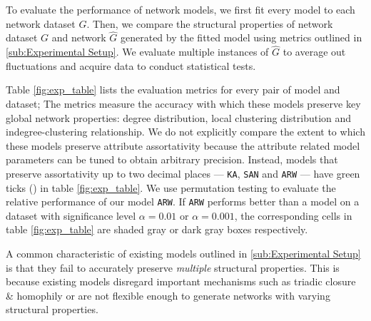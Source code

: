 To evaluate the performance of network models, we first fit every model
to each network dataset $G$. Then, we compare the structural properties of
network dataset $G$ and network $\hat{G}$ generated by the fitted model using
metrics outlined in \cref{sub:Experimental Setup}. We evaluate multiple instances
of $\hat{G}$ to average out fluctuations and acquire data to conduct statistical tests.

Table \ref{fig:exp_table} lists the evaluation metrics for every pair of model
and dataset; The metrics measure the accuracy with which these models
preserve key global network properties: degree distribution, local clustering distribution
and indegree-clustering relationship.
We do not explicitly compare the extent to which these models preserve
attribute assortativity because the attribute related model parameters can be tuned to obtain
arbitrary precision. Instead, models that preserve assortativity up to two decimal
places --- \texttt{KA}, \texttt{SAN} and \texttt{ARW}
--- have green ticks (\checkmark) in table \ref{fig:exp_table}.
We use permutation testing to evaluate the relative performance of our model \texttt{ARW}. If
\texttt{ARW} performs better than a model on a dataset with significance level
$\alpha=0.01$ or $\alpha=0.001$, the corresponding cells in table \ref{fig:exp_table}
are shaded gray or dark gray boxes respectively.


A common characteristic of existing models outlined in \cref{sub:Experimental Setup}
is that they fail to accurately preserve \textit{multiple} structural properties.
This is because existing models disregard important mechanisms such as triadic closure
\& homophily or are not flexible enough to generate networks with varying structural properties.



